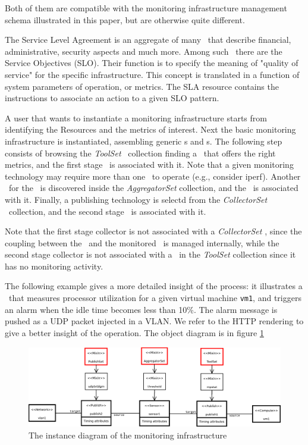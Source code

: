 \documentclass[12pt]{article}  %
\begin{document}
{Both of them are compatible with the monitoring infrastructure management schema illustrated in this paper, but are otherwise quite different.

The Service Level Agreement is an aggregate of many \rs\, that describe financial, administrative, security aspects and much more. Among such \rs\, there are the Service  Objectives (SLO). Their function is to specify the meaning of "quality of service" for the specific infrastructure. This concept is translated in a function of system parameters of operation, or metrics.
 The SLA resource contains the instructions to associate an action to a given SLO pattern.

A user that wants to instantiate a monitoring infrastructure starts from identifying the Resources and the metrics of interest. Next the basic monitoring infrastructure is instantiated, assembling generic \sens s and \coll s. The following step consists of browsing the {\em ToolSet} \mi\ collection finding a \mi\ that offers the right metrics, and the first stage \coll\ is associated with it. Note that a given monitoring technology may require more than one \coll\ to operate (e.g., consider iperf). Another \mi\ for the \sens\ is discovered inside the {\em AggregatorSet} collection, and the \sens\ is associated with it. Finally, a publishing technology is selectd from the {\em CollectorSet} \mi\ collection, and the second stage \coll\ is associated with it.

Note that the first stage collector is not associated with a {\em CollectorSet} \mi, since the coupling between the \sens\ and the monitored \rs\ is managed internally, while the second stage collector is not associated with a \mi\ in the {\em ToolSet} collection since it has no monitoring activity. 

The following example gives a more detailed insight of the process: it illustrates a \sens\ that measures processor utilization for a given virtual machine {\tt vm1}, and triggers an alarm when the idle time becomes less than 10\%. The alarm message is pushed as a UDP packet injected in a VLAN. We refer to the HTTP rendering to give a better insight of the operation. The object diagram is in figure \ref  {fig:example}

\begin{figure}
\centering
\includegraphics[width=\linewidth]{newDiagram_V3.pdf}
\caption{The instance diagram of the monitoring infrastructure \label{fig:example}}
\end{figure}

}
\end{document}
